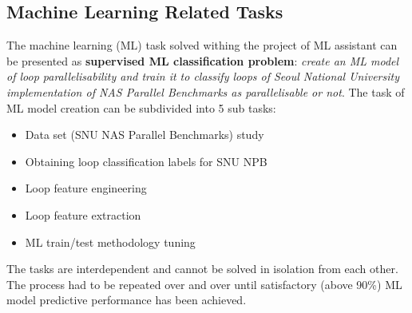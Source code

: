 \documentclass[10pt,a4paper]{report}
\begin{document}
\subsection{Machine Learning Related Tasks}
\quad The machine learning (ML) task solved withing the project of ML assistant can be presented as \textbf{supervised ML classification problem}: \textit{create an ML model of loop parallelisability and train it to classify loops of Seoul National University implementation \cite{snu-npb-benchmarks} of NAS Parallel Benchmarks \cite{nasa-parallel-benchmarks} as parallelisable or not}. The task of ML model creation can be subdivided into 5 sub tasks:
\begin{itemize}
\renewcommand\labelitemi{$\bullet$}
\item Data set (SNU NAS Parallel Benchmarks) study
\item Obtaining loop classification labels for SNU NPB
\item Loop feature engineering
\item Loop feature extraction
\item ML train/test methodology tuning
\end{itemize}
\quad The tasks are interdependent and cannot be solved in isolation from each other. The process had to be repeated over and over until satisfactory (above 90\%) ML model predictive performance has been achieved.
\end{document}
